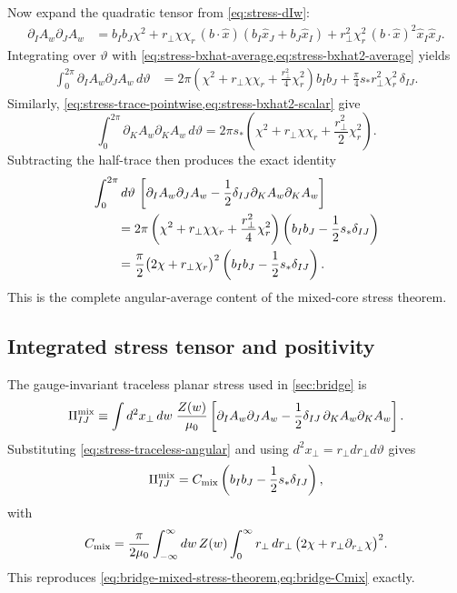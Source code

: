 \documentclass[11pt]{article}
\theoremstyle{plain}
\theoremstyle{definition}
\theoremstyle{remark}
\begin{document}
Now expand the quadratic tensor from \cref{eq:stress-dIw}:
\begin{align}
\partial_I A_w\partial_J A_w
&=
b_Ib_J\chi^2
+r_\perp\chi\chi_r\,(b\!\cdot\!\hat x)(b_I\hat x_J+b_J\hat x_I)
+r_\perp^2\chi_r^2\,(b\!\cdot\!\hat x)^2\hat x_I\hat x_J.
\label{eq:stress-product-expanded}
\end{align}
Integrating over \(\vartheta\) with \cref{eq:stress-bxhat-average,eq:stress-bxhat2-average} yields
\begin{align}
\int_0^{2\pi}\partial_I A_w\partial_J A_w\,d\vartheta
&=
2\pi\left(\chi^2+r_\perp\chi\chi_r+\frac{r_\perp^2}{4}\chi_r^2\right)b_Ib_J
+\frac{\pi}{4}s_*r_\perp^2\chi_r^2\,\delta_{IJ}.
\label{eq:stress-product-angular}
\end{align}
Similarly, \cref{eq:stress-trace-pointwise,eq:stress-bxhat2-scalar} give
\begin{equation}
\int_0^{2\pi}\partial_KA_w\partial_KA_w\,d\vartheta
=
2\pi s_*\left(\chi^2+r_\perp\chi\chi_r+\frac{r_\perp^2}{2}\chi_r^2\right).
\label{eq:stress-trace-angular}
\end{equation}
Subtracting the half-trace then produces the exact identity
\begin{align}
&\int_0^{2\pi}d\vartheta\,
\left[
\partial_IA_w\partial_JA_w
-\frac12\delta_{IJ}\partial_KA_w\partial_KA_w
\right]
\notag\\
&\qquad=
2\pi\left(\chi^2+r_\perp\chi\chi_r+\frac{r_\perp^2}{4}\chi_r^2\right)
\left(b_Ib_J-\frac12s_*\delta_{IJ}\right)
\notag\\
&\qquad=
\frac{\pi}{2}\bigl(2\chi+r_\perp\chi_r\bigr)^2
\left(b_Ib_J-\frac12s_*\delta_{IJ}\right).
\label{eq:stress-traceless-angular}
\end{align}
This is the complete angular-average content of the mixed-core stress theorem.

\subsection{Integrated stress tensor and positivity}\label{subsec:stress-positivity}

The gauge-invariant traceless planar stress used in \cref{sec:bridge} is
\begin{equation}
\Pi^{\rm mix}_{IJ}
\equiv
\int d^2x_\perp\,dw\;
\frac{Z(w)}{\mu_0}
\left[
\partial_I A_w\partial_J A_w
-\frac12\delta_{IJ}\,\partial_K A_w\partial_K A_w
\right].
\label{eq:stress-tensor-def}
\end{equation}
Substituting \cref{eq:stress-traceless-angular} and using \(d^2x_\perp=r_\perp dr_\perp d\vartheta\) gives
\begin{equation}
\Pi^{\rm mix}_{IJ}
=
C_{\rm mix}
\left(
 b_Ib_J-\frac12s_*\delta_{IJ}
\right),
\label{eq:stress-tensor-result}
\end{equation}
with
\begin{equation}
C_{\rm mix}
=
\frac{\pi}{2\mu_0}
\int_{-\infty}^{\infty}dw\,Z(w)
\int_0^{\infty}r_\perp\,dr_\perp\,
\bigl(2\chi+r_\perp\partial_{r_\perp}\chi\bigr)^2.
\label{eq:stress-Cmix}
\end{equation}
This reproduces \cref{eq:bridge-mixed-stress-theorem,eq:bridge-Cmix} exactly.
\end{document}
